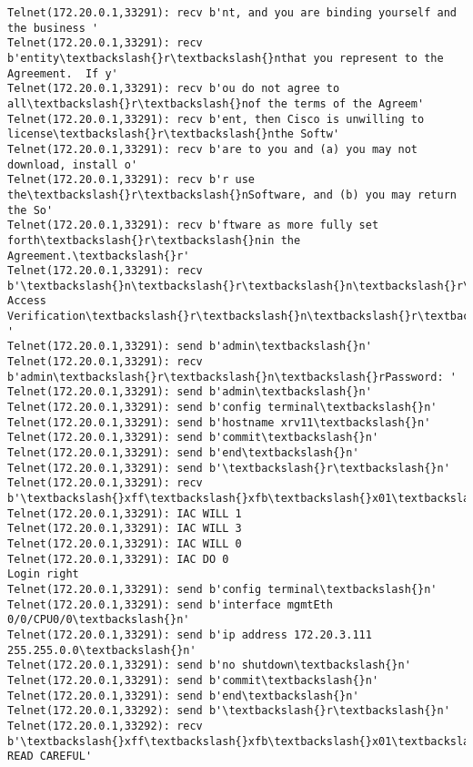 \documentclass[11pt]{article}
\begin{document}
\begin{Verbatim}[commandchars=\\\{\}]
Telnet(172.20.0.1,33291): recv b'nt, and you are binding yourself and the business '
Telnet(172.20.0.1,33291): recv b'entity\textbackslash{}r\textbackslash{}nthat you represent to the Agreement.  If y'
Telnet(172.20.0.1,33291): recv b'ou do not agree to all\textbackslash{}r\textbackslash{}nof the terms of the Agreem'
Telnet(172.20.0.1,33291): recv b'ent, then Cisco is unwilling to license\textbackslash{}r\textbackslash{}nthe Softw'
Telnet(172.20.0.1,33291): recv b'are to you and (a) you may not download, install o'
Telnet(172.20.0.1,33291): recv b'r use the\textbackslash{}r\textbackslash{}nSoftware, and (b) you may return the So'
Telnet(172.20.0.1,33291): recv b'ftware as more fully set forth\textbackslash{}r\textbackslash{}nin the Agreement.\textbackslash{}r'
Telnet(172.20.0.1,33291): recv b'\textbackslash{}n\textbackslash{}r\textbackslash{}n\textbackslash{}r\textbackslash{}nUser Access Verification\textbackslash{}r\textbackslash{}n\textbackslash{}r\textbackslash{}nUsername: '
Telnet(172.20.0.1,33291): send b'admin\textbackslash{}n'
Telnet(172.20.0.1,33291): recv b'admin\textbackslash{}r\textbackslash{}n\textbackslash{}rPassword: '
Telnet(172.20.0.1,33291): send b'admin\textbackslash{}n'
Telnet(172.20.0.1,33291): send b'config terminal\textbackslash{}n'
Telnet(172.20.0.1,33291): send b'hostname xrv11\textbackslash{}n'
Telnet(172.20.0.1,33291): send b'commit\textbackslash{}n'
Telnet(172.20.0.1,33291): send b'end\textbackslash{}n'
Telnet(172.20.0.1,33291): send b'\textbackslash{}r\textbackslash{}n'
Telnet(172.20.0.1,33291): recv b'\textbackslash{}xff\textbackslash{}xfb\textbackslash{}x01\textbackslash{}xff\textbackslash{}xfb\textbackslash{}x03\textbackslash{}xff\textbackslash{}xfb\textbackslash{}x00\textbackslash{}xff\textbackslash{}xfd\textbackslash{}x00\textbackslash{}x1b]0;xrv11\textbackslash{}x07\textbackslash{}r\textbackslash{}n\textbackslash{}rRP/0/0/CPU0:xrv11\#\textbackslash{}r\textbackslash{}n\textbackslash{}rRP/0'
Telnet(172.20.0.1,33291): IAC WILL 1
Telnet(172.20.0.1,33291): IAC WILL 3
Telnet(172.20.0.1,33291): IAC WILL 0
Telnet(172.20.0.1,33291): IAC DO 0
Login right
Telnet(172.20.0.1,33291): send b'config terminal\textbackslash{}n'
Telnet(172.20.0.1,33291): send b'interface mgmtEth 0/0/CPU0/0\textbackslash{}n'
Telnet(172.20.0.1,33291): send b'ip address 172.20.3.111 255.255.0.0\textbackslash{}n'
Telnet(172.20.0.1,33291): send b'no shutdown\textbackslash{}n'
Telnet(172.20.0.1,33291): send b'commit\textbackslash{}n'
Telnet(172.20.0.1,33291): send b'end\textbackslash{}n'
Telnet(172.20.0.1,33292): send b'\textbackslash{}r\textbackslash{}n'
Telnet(172.20.0.1,33292): recv b'\textbackslash{}xff\textbackslash{}xfb\textbackslash{}x01\textbackslash{}xff\textbackslash{}xfb\textbackslash{}x03\textbackslash{}xff\textbackslash{}xfb\textbackslash{}x00\textbackslash{}xff\textbackslash{}xfd\textbackslash{}x00\textbackslash{}x1b]0;xrv12\textbackslash{}x07\textbackslash{}r\textbackslash{}n\textbackslash{}r\textbackslash{}nIMPORTANT:  READ CAREFUL'

\end{Verbatim}
\end{document}
